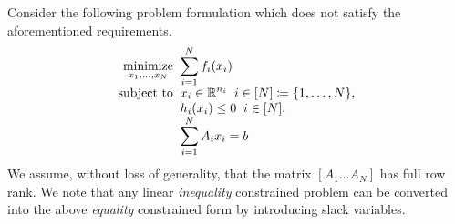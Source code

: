 \documentclass[11pt]{article}
\begin{document}
Consider the following problem formulation which does not satisfy the aforementioned requirements.
\begin{equation}\label{eq:nlp_general}
\begin{array}{r@{\;\;}l}
\displaystyle\mathop{\text{minimize}}_{x_1, \ldots, x_N} & \displaystyle \sum_{i = 1}^N f_i(x_i) \\
\text{subject to} & \displaystyle x_i \in \mathbb{R}^{n_i} \;\; i \in [N] \coloneqq \{1, \ldots, N\}, \\
& \displaystyle h_i(x_i) \leq 0 \;\; i \in [N], \\
& \displaystyle \sum_{i = 1}^N A_i x_i = b
\end{array}
\end{equation}
We assume, without loss of generality, that the matrix $[A_1 \ldots A_N]$ has full row rank.
We note that any linear \textit{inequality} constrained problem can be converted into the above \textit{equality} constrained form by introducing slack variables.
\end{document}
